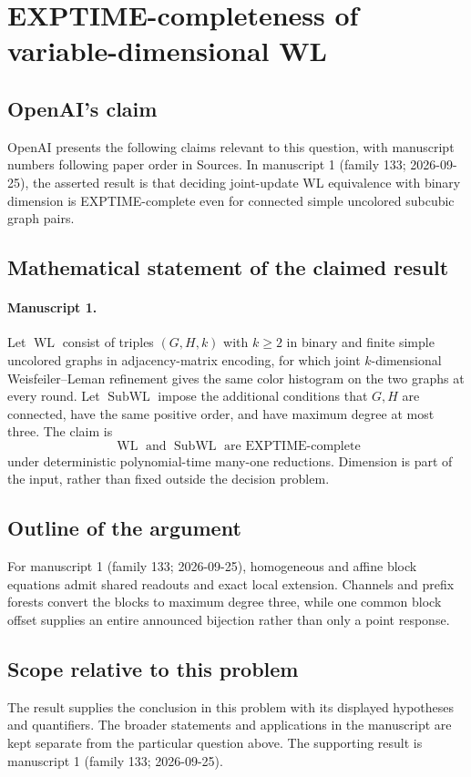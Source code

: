 \documentclass[11pt]{article}
\begin{document}
\section*{EXPTIME-completeness of variable-dimensional WL}

\subsection{OpenAI's claim}
OpenAI presents the following claims relevant to this question, with manuscript numbers following paper order in Sources. In manuscript 1 (family 133; 2026-09-25), the asserted result is that deciding joint-update WL equivalence with binary dimension is EXPTIME-complete even for connected simple uncolored subcubic graph pairs.

\subsection{Mathematical statement of the claimed result}
\paragraph{Manuscript 1.}
Let $\operatorname{WL}$ consist of triples $(G,H,k)$ with $k\ge2$ in binary and finite simple uncolored graphs in adjacency-matrix encoding, for which joint $k$-dimensional Weisfeiler--Leman refinement gives the same color histogram on the two graphs at every round. Let $\operatorname{SubWL}$ impose the additional conditions that $G,H$ are connected, have the same positive order, and have maximum degree at most three. The claim is
\[
 \operatorname{WL}\text{ and }\operatorname{SubWL}\text{ are EXPTIME-complete}
\]
under deterministic polynomial-time many-one reductions. Dimension is part of the input, rather than fixed outside the decision problem.

\subsection{Outline of the argument}
For manuscript 1 (family 133; 2026-09-25), homogeneous and affine block equations admit shared readouts and exact local extension. Channels and prefix forests convert the blocks to maximum degree three, while one common block offset supplies an entire announced bijection rather than only a point response.

\subsection{Scope relative to this problem}
The result supplies the conclusion in this problem with its displayed hypotheses and quantifiers. The broader statements and applications in the manuscript are kept separate from the particular question above. The supporting result is manuscript 1 (family 133; 2026-09-25).
\end{document}

